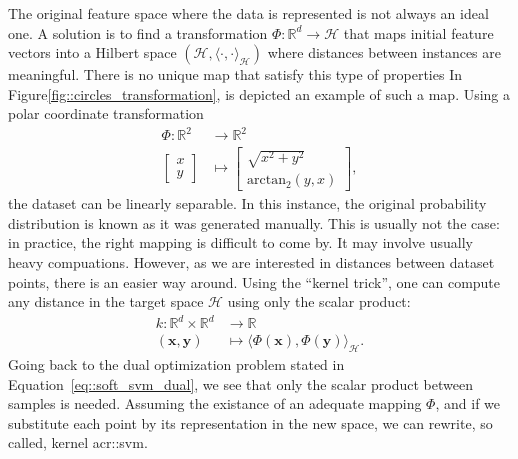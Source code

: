                The original feature space where the data is represented is not always an ideal one.
                A solution is to find a transformation $\Phi: \mathbb{R}^d \rightarrow \mathscr{H}$ that maps initial feature vectors into a Hilbert space $(\mathscr{H}, \langle\cdot{,}\cdot\rangle_{\mathscr{H}})$ where distances between instances are meaningful.
                There is no unique map that satisfy this type of properties
                In Figure\ref{fig::circles_transformation}, is depicted an example of such a map.
                Using a polar coordinate transformation 
                \begin{align*}
                    \Phi: \mathbb{R}^2 &\rightarrow \mathbb{R}^2 \\
                    \begin{bmatrix}
                        x \\
                        y
                    \end{bmatrix} &\mapsto \begin{bmatrix}
                        \sqrt{x^2 + y^2} \\
                        \text{arctan}_2(y, x)
                    \end{bmatrix},
                \end{align*}
                the dataset can be linearly separable.
                In this instance, the original probability distribution is known as it was generated manually.
                This is usually not the case: in practice, the right mapping is difficult to come by.
                It may involve usually heavy compuations.
                However, as we are interested in distances between dataset points, there is an easier way around.
                Using the ``kernel trick'', one can compute any distance in the target space $\mathscr{H}$ using only the scalar product:
                \begin{align}
                    \label{fig::kernel_definition}
                    k: \mathbb{R}^d \times \mathbb{R}^d &\rightarrow \mathbb{R}\\
                    (\bm{x}, \bm{y}) &\mapsto \langle\Phi(\bm{x}), \Phi(\bm{y})\rangle_{\mathscr{H}} \nonumber.
                \end{align}
                Going back to the dual optimization problem stated in Equation~\ref{eq::soft_svm_dual}, we see that only the scalar product between samples is needed.
                Assuming the existance of an adequate mapping $\Phi$, and if we substitute each point by its representation in the new space, we can rewrite, so called, kernel \gls{acr::svm}.
